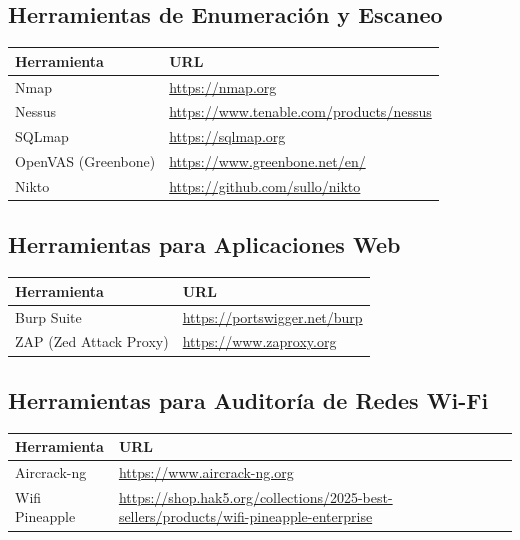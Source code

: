 \documentclass[a4paper, 11pt]{article}
\begin{document}
\subsection*{Herramientas de Enumeración y Escaneo}
\begin{table}[H]
\centering
\begin{tabular}{|m{5cm}|m{10cm}|}
\hline
\textbf{Herramienta} & \textbf{URL} \\
\hline
Nmap & \url{https://nmap.org} \\
\hline
Nessus & \url{https://www.tenable.com/products/nessus} \\
\hline
SQLmap & \url{https://sqlmap.org} \\
\hline
OpenVAS (Greenbone) & \url{https://www.greenbone.net/en/} \\
\hline
Nikto & \url{https://github.com/sullo/nikto} \\
\hline
\end{tabular}
\end{table}

\subsection*{Herramientas para Aplicaciones Web}
\begin{table}[H]
\centering
\begin{tabular}{|m{5cm}|m{10cm}|}
\hline
\textbf{Herramienta} & \textbf{URL} \\
\hline
Burp Suite & \url{https://portswigger.net/burp} \\
\hline
ZAP (Zed Attack Proxy) & \url{https://www.zaproxy.org} \\
\hline
\end{tabular}
\end{table}

\subsection*{Herramientas para Auditoría de Redes Wi-Fi}
\begin{table}[H]
\centering
\begin{tabular}{|m{5cm}|m{10cm}|}
\hline
\textbf{Herramienta} & \textbf{URL} \\
\hline
Aircrack-ng & \url{https://www.aircrack-ng.org} \\
\hline
Wifi Pineapple & \url{https://shop.hak5.org/collections/2025-best-sellers/products/wifi-pineapple-enterprise} \\
\hline
\end{tabular}
\end{table}
\end{document}
